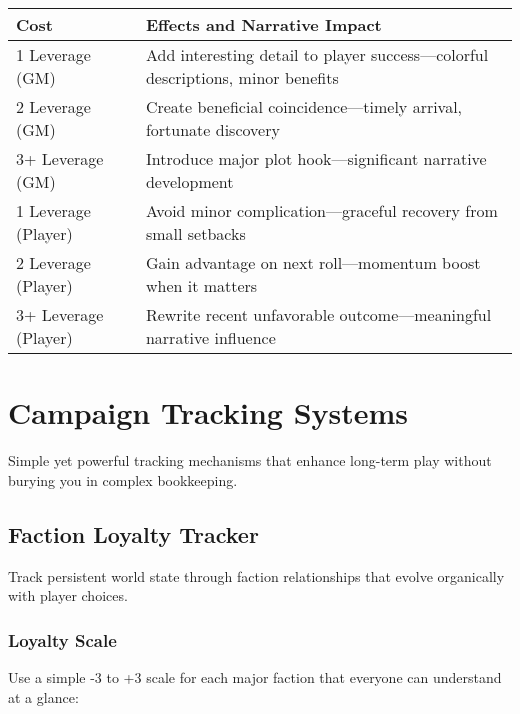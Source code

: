 \begin{fatebox}
\begin{tabularx}{\textwidth}{lX}
\toprule
\textbf{Cost} & \textbf{Effects and Narrative Impact} \\
\midrule
1 Leverage (GM) & Add interesting detail to player success—colorful descriptions, minor benefits \\
2 Leverage (GM) & Create beneficial coincidence—timely arrival, fortunate discovery \\
3+ Leverage (GM) & Introduce major plot hook—significant narrative development \\
1 Leverage (Player) & Avoid minor complication—graceful recovery from small setbacks \\
2 Leverage (Player) & Gain advantage on next roll—momentum boost when it matters \\
3+ Leverage (Player) & Rewrite recent unfavorable outcome—meaningful narrative influence \\
\bottomrule
\end{tabularx}
\end{fatebox}

\section*{Campaign Tracking Systems}

Simple yet powerful tracking mechanisms that enhance long-term play without burying you in complex bookkeeping.

\subsection*{Faction Loyalty Tracker}

Track persistent world state through faction relationships that evolve organically with player choices.

\subsubsection*{Loyalty Scale}

Use a simple -3 to +3 scale for each major faction that everyone can understand at a glance:

